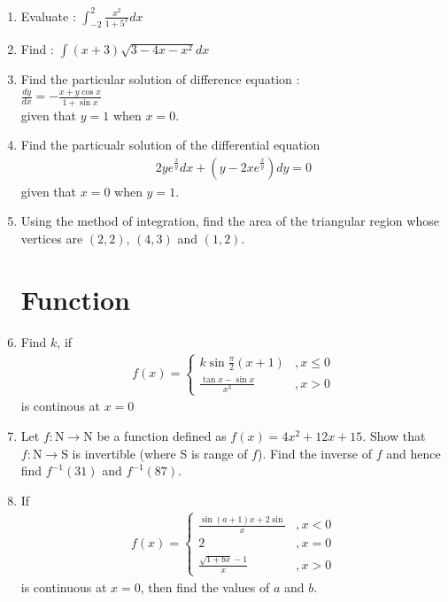 \documentclass[12pt,-letter paper]{article}
\begin{document}
\begin{enumerate}
	\item Evaluate : $\int_{-2}^{2} \frac{x^2}{1+5^x} dx$

	\item Find : $\int (x+3)\sqrt{3 - 4x - x^2} dx$\\

	\item Find the particular solution of difference equation :\\
 $\frac{dy}{dx} = - \frac{x + y\cos x}{1 + \sin x}$ \\
 given that $y = 1$ when $x = 0$.

	\item Find the particualr solution of the differential equation
	\begin{align}
		2y e^{\frac{x}{y}} dx + (y -2x e^{\frac{x}{y}}) dy = 0
	\end{align}
given that $x = 0$ when $y = 1$.

	\item Using the method of integration, find the area of the triangular region whose vertices are $(2, 2)$, $(4, 3)$ and $(1, 2)$.


\section{Function}
	\item Find $k$, if 
	\begin{align}
		f(x) = \begin{cases} k\sin \frac{\pi}{2}(x+1) &,x \leq 0\\
		\frac{\tan x - \sin x}{x^3} &, x>0
		\end{cases}
	\end{align}
is continous at $x=0$
	
	\item Let $f: \text{N} \rightarrow \text{N}$ be a function defined as 
	$f(x) = 4x^2 + 12x + 15.$
Show that $f: \text{N} \rightarrow \text{S}$ is invertible (where S is range of $f$).
Find the inverse of $f$ and hence find $f^{-1}(31)$ and $f^{-1}(87)$.


	\item If 
	\begin{align}
		f(x) = 
		\begin{cases}
			\frac{\sin(a+1)x + 2\sin}{x} &,x<0 \\
			2 &,x = 0\\
			\frac{\sqrt{1+bx}-1}{x} &,x>0
		\end{cases}
	\end{align}
is continuous at $x = 0$, then find the values of $a$ and $b$.


\end{enumerate}
\end{document}
